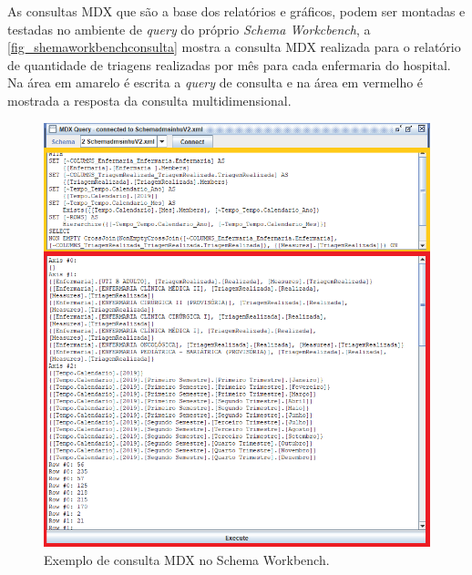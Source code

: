 \newpage
As consultas MDX que são a base dos relatórios e gráficos, podem ser montadas e testadas no ambiente de \textit{query} do próprio \textit{Schema Workcbench}, a \autoref{fig_shemaworkbenchconsulta} mostra a consulta MDX realizada para o relatório de quantidade de triagens realizadas por mês para cada enfermaria do hospital. Na área em amarelo é escrita a \textit{query} de consulta e na área em vermelho é mostrada a resposta da consulta multidimensional.
\begin{figure}[htb]
	\caption{\label{fig_shemaworkbenchconsulta}Exemplo de consulta MDX no Schema Workbench.}
	\begin{center}
	    \includegraphics[scale=0.7]{Imagens/figura - workbenchconsulta.png}
	\end{center}
\end{figure}

\newpage
